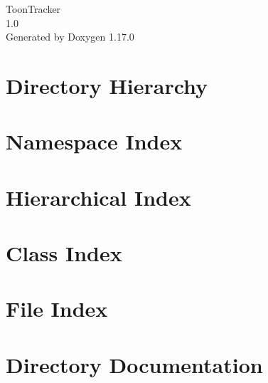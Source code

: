 \documentclass[twoside]{book}
\newcommand{\+}{\discretionary{\mbox{\scriptsize$\hookleftarrow$}}{}{}}
\newcommand{\clearemptydoublepage}{%
    \newpage{\pagestyle{empty}\cleardoublepage}%
  }
\begin{document}
  \raggedbottom
    \hypersetup{pageanchor=false,
                bookmarksnumbered=true,
                pdfencoding=unicode
               }
  \begin{titlepage}
  \vspace*{7cm}
  \begin{center}%
  {\Large Toon\+Tracker}\\
  [1ex]\large 1.\+0 \\
  \vspace*{1cm}
  {\large Generated by Doxygen 1.17.0}\\
  \end{center}
  \end{titlepage}
  \clearemptydoublepage
  \tableofcontents
  \clearemptydoublepage
  \hypersetup{pageanchor=true}
\chapter{Directory Hierarchy}

\chapter{Namespace Index}

\chapter{Hierarchical Index}

\chapter{Class Index}

\chapter{File Index}

\chapter{Directory Documentation}























\end{document}
